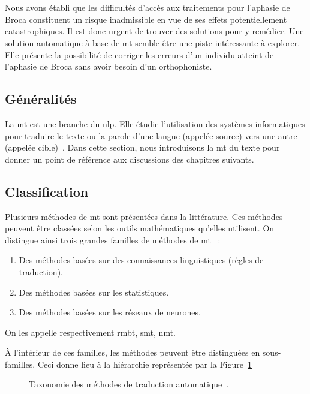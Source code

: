 \section{}

Nous avons établi que les difficultés d'accès aux traitements pour l'aphasie de Broca 
constituent un risque inadmissible en vue de ses effets potentiellement catastrophiques.
Il est donc urgent de trouver des solutions pour y remédier.
Une solution automatique à base de \gls{mt} semble être une piste intéressante à explorer.
Elle présente la possibilité de corriger les erreurs d'un individu atteint de l'aphasie de Broca
sans avoir besoin d'un orthophoniste.

\subsection{Généralités}

La \gls{mt} est une branche du \gls{nlp}.
Elle étudie l'utilisation des systèmes informatiques pour traduire le texte ou la parole 
d'une langue (appelée source) vers une autre (appelée cible)~\cite{routledge}.
Dans cette section, nous introduisons la \gls{mt} du texte 
pour donner un point de référence aux discussions des chapitres suivants.

\subsection{Classification}

Plusieurs méthodes de \gls{mt} sont présentées dans la littérature.
Ces méthodes peuvent être classées selon les outils mathématiques qu'elles utilisent.
On distingue ainsi trois grandes familles de méthodes de \gls{mt}~\cite{deep-nmt-survey} :
\begin{enumerate}[label=\arabic*. ]
    \item Des méthodes basées sur des connaissances linguistiques (règles de traduction).
    \item Des méthodes basées sur les statistiques.
    \item Des méthodes basées sur les réseaux de neurones.
\end{enumerate}
On les appelle respectivement \gls{rmbt}, \gls{smt}, \gls{nmt}.

À l'intérieur de ces familles, les méthodes peuvent être distinguées en sous-familles.
Ceci donne lieu à la hiérarchie représentée par la Figure~\ref{fig.mt-taxonomy-tree}
\begin{figure}[hbt]
    \centering
    \resizebox{\textwidth}{!}{ }
    \caption[Taxonomie des méthodes de traduction automatique.]
    {Taxonomie des méthodes de traduction automatique~\cite{deep-nmt-survey,hybrid-mt}.}
    \label{fig.mt-taxonomy-tree}
\end{figure}

